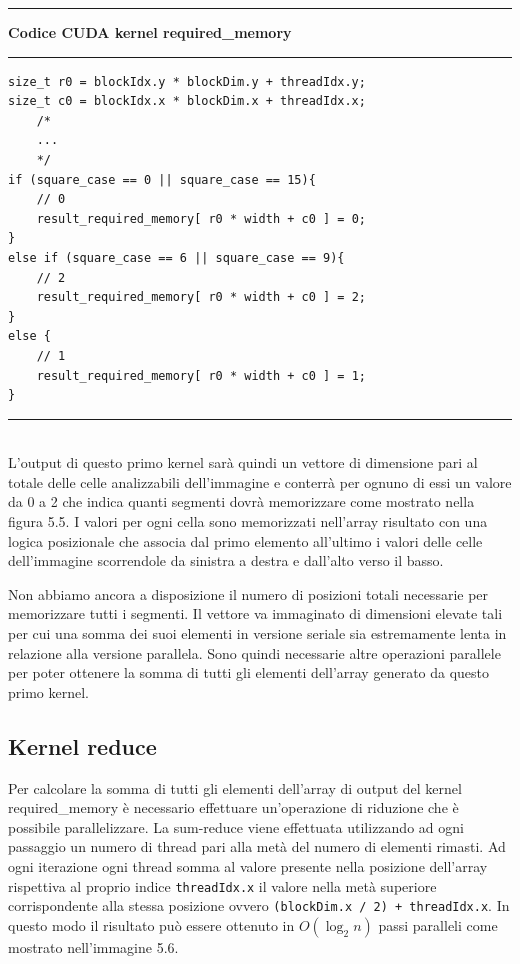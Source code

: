 \documentclass[12pt,a4paper]{report}
\begin{document}
\noindent\rule[0.5ex]{\linewidth}{2pt}
\small{\textbf{Codice CUDA kernel required\_memory}} \\
\noindent\rule[0.5ex]{\linewidth}{1pt}
\begin{lstlisting}
size_t r0 = blockIdx.y * blockDim.y + threadIdx.y;
size_t c0 = blockIdx.x * blockDim.x + threadIdx.x;
    /*
    ...
    */
if (square_case == 0 || square_case == 15){
    // 0
    result_required_memory[ r0 * width + c0 ] = 0;
}
else if (square_case == 6 || square_case == 9){
    // 2
    result_required_memory[ r0 * width + c0 ] = 2;
}
else {
    // 1
    result_required_memory[ r0 * width + c0 ] = 1;
}  
\end{lstlisting}
\noindent\rule[0.5ex]{\linewidth}{1pt} \\[10pt]
\newpage
L'output di questo primo kernel sarà quindi un vettore di dimensione pari al totale delle celle analizzabili dell'immagine e conterrà per ognuno di essi un valore da 0 a 2 che indica quanti segmenti dovrà memorizzare come mostrato nella figura 5.5. I valori per ogni cella sono memorizzati nell'array risultato con una logica posizionale che associa dal primo elemento all'ultimo i valori delle celle dell'immagine scorrendole da sinistra a destra e dall'alto verso il basso.
\begin{figure}[H]
\centering
\begin{floatrow}[1]
\end{floatrow}
\end{figure} 
Non abbiamo ancora a disposizione il numero di posizioni totali necessarie per memorizzare tutti i segmenti. Il vettore va immaginato di dimensioni elevate tali per cui una somma dei suoi elementi in versione seriale sia estremamente lenta in relazione alla versione parallela. Sono quindi necessarie altre operazioni parallele per poter ottenere la somma di tutti gli elementi dell'array generato da questo primo kernel. \newpage

\subsection{Kernel reduce}
Per calcolare la somma di tutti gli elementi dell'array di output del kernel required\_memory è necessario effettuare un'operazione di riduzione che è possibile parallelizzare. \newline
La sum-reduce viene effettuata utilizzando ad ogni passaggio un numero di thread pari alla metà del numero di elementi rimasti. Ad ogni iterazione ogni thread somma al valore presente nella posizione dell'array rispettiva al proprio indice \verb|threadIdx.x| il valore nella metà superiore corrispondente alla stessa posizione ovvero \verb|(blockDim.x / 2) + threadIdx.x|. \newline In questo modo il risultato può essere ottenuto in $O(\log_2 n)$ passi paralleli come mostrato nell'immagine 5.6.
\end{document}
